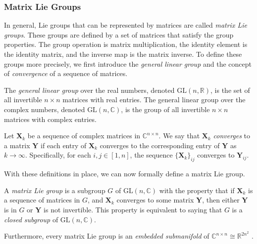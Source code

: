 \subsubsection{Matrix Lie Groups}
In general, Lie groups that can be represented by matrices are called \emph{matrix Lie groups}. These groups are defined by a set of matrices that satisfy the group properties. The group operation is matrix multiplication, the identity element is the identity matrix, and the inverse map is the matrix inverse. To define these groups more precisely, we first introduce the \emph{general linear group} and the concept of \emph{convergence} of a sequence of matrices.
\begin{definition}
    The \emph{general linear group} over the real numbers, denoted $\text{GL}(n, \mathbb{R})$, is the set of all invertible $n\times n$ matrices with real entries. The general linear group over the complex numbers, denoted $\text{GL}(n, \mathbb{C})$, is the group of all invertible $n\times n$ matrices with complex entries.
\end{definition}
\begin{definition}
    Let $\mathbf{X}_k$ be a sequence of complex matrices in $\mathbb{C}^{n\times n}$. We say that $\mathbf{X}_k$ \emph{converges} to a matrix $\mathbf{Y}$ if each entry of $\mathbf{X}_k$ converges to the corresponding entry of $\mathbf{Y}$ as $k\to\infty$. Specifically, for each $i,j\in[1,n]$, the sequence $\{\mathbf{X}_k\}_{ij}$ converges to $\mathbf{Y}_{ij}$.
\end{definition}
With these definitions in place, we can now formally define a matrix Lie group.
\begin{definition}
    A \emph{matrix Lie group} is a subgroup $G$ of $\text{GL}(n, \mathbb{C})$ with the property that if $\mathbf{X}_k$ is a sequence of matrices in $G$, and $\mathbf{X}_k$ converges to some matrix $\mathbf{Y}$, then either $\mathbf{Y}$ is in $G$ or $\mathbf{Y}$ is not invertible. This property is equivalent to saying that $G$ is a \emph{closed subgroup} of $\text{GL}(n, \mathbb{C})$.
\end{definition}
Furthermore, every matrix Lie group is an \emph{embedded submanifold} of $\mathbb{C}^{n\times n}\cong\mathbb{R}^{2n^2}$ \citep[p. 70]{Hall2015}.

